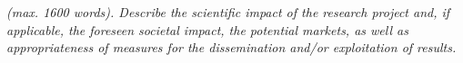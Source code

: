 % 
%
%
%

\emph{(max. 1600 words). Describe the scientific impact of the research project and, if applicable, the foreseen societal impact, the potential markets, as well as appropriateness of measures for the dissemination and/or exploitation of results.}  





% 
